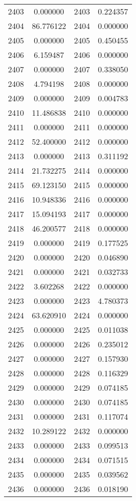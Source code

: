 \documentclass[12pt]{article}
\begin{document}
\begin{longtable}{@{}cccc@{}}
2403 & 0.000000 & 2403 & 0.224357 \\
2404 & 86.776122 & 2404 & 0.000000 \\
2405 & 0.000000 & 2405 & 0.450455 \\
2406 & 6.159487 & 2406 & 0.000000 \\
2407 & 0.000000 & 2407 & 0.338050 \\
2408 & 4.794198 & 2408 & 0.000000 \\
2409 & 0.000000 & 2409 & 0.004783 \\
2410 & 11.486838 & 2410 & 0.000000 \\
2411 & 0.000000 & 2411 & 0.000000 \\
2412 & 52.400000 & 2412 & 0.000000 \\
2413 & 0.000000 & 2413 & 0.311192 \\
2414 & 21.732275 & 2414 & 0.000000 \\
2415 & 69.123150 & 2415 & 0.000000 \\
2416 & 10.948336 & 2416 & 0.000000 \\
2417 & 15.094193 & 2417 & 0.000000 \\
2418 & 46.200577 & 2418 & 0.000000 \\
2419 & 0.000000 & 2419 & 0.177525 \\
2420 & 0.000000 & 2420 & 0.046890 \\
2421 & 0.000000 & 2421 & 0.032733 \\
2422 & 3.602268 & 2422 & 0.000000 \\
2423 & 0.000000 & 2423 & 4.780373 \\
2424 & 63.620910 & 2424 & 0.000000 \\
2425 & 0.000000 & 2425 & 0.011038 \\
2426 & 0.000000 & 2426 & 0.235012 \\
2427 & 0.000000 & 2427 & 0.157930 \\
2428 & 0.000000 & 2428 & 0.116329 \\
2429 & 0.000000 & 2429 & 0.074185 \\
2430 & 0.000000 & 2430 & 0.074185 \\
2431 & 0.000000 & 2431 & 0.117074 \\
2432 & 10.289122 & 2432 & 0.000000 \\
2433 & 0.000000 & 2433 & 0.099513 \\
2434 & 0.000000 & 2434 & 0.071515 \\
2435 & 0.000000 & 2435 & 0.039562 \\
2436 & 0.000000 & 2436 & 0.018190 \\

\end{longtable}
\end{document}
